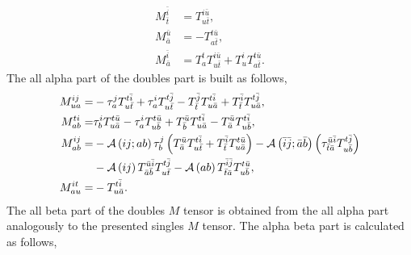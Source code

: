 \documentclass[a4paper,12pt,oneside]{book}
\newcommand{\asop}[1]{{\cal A}\left(#1\right)}
\newcommand{\ASop}[2]{{\cal A}\left(#1;#2\right)}
\newcommand{\spa}[1]{{#1}}
\newcommand{\spb}[1]{\bar{#1}}
\begin{document}
\begin{align}
M^{\spb{i}}_{\spb{t}} &= T^{\spa{i}\spb{u}}_{\spa{u}\spb{t}}, \\
M^{\spb{u}}_{\spb{a}} &= - T^{\spa{t}\spb{u}}_{\spa{a}\spb{t}}, \\
M^{\spb{i}}_{\bar{a}} &= T^{\spa{t}}_{\spa{a}} T^{\spa{i}\spb{u}}_{u\spb{t}} + T^{\spa{i}}_{\spa{u}} T^{\spa{t}\spb{u}}_{\spa{a}\spb{t}}.
\end{align}
The all alpha part of the doubles part is built as follows,
\begin{align}
M^{\spa{i}\spa{j}}_{\spa{u}\spa{a}} = &-\tau^{\spa{j}}_{\spa{a}} T^{\spa{t}\spb{i}}_{\spa{u}\spb{t}} 
                                       +\tau^{\spa{i}}_{\spa{a}} T^{\spa{t}\spb{j}}_{\spa{u}\spb{t}} 
                                       -T^{\spb{j}}_{\spb{t}} T^{\spa{t}\spb{i}}_{\spa{u}\spb{a}} 
                                       +T^{\spb{i}}_{\spb{t}} T^{\spa{t}\spb{j}}_{\spa{u}\spb{a}}, \\
M^{\spa{t}\spa{i}}_{\spa{a}\spa{b}} = &\tau^{\spa{i}}_{\spa{b}} T^{\spa{t}\spb{u}}_{\spa{u}\spb{a}} 
                                      -\tau^{\spa{i}}_{\spa{a}} T^{\spa{t}\spb{u}}_{\spa{u}\spb{b}} 
                                      +T^{\spb{u}}_{\spb{b}} T^{\spa{t}\spb{i}}_{\spa{u}\spb{a}} 
                                      -T^{\spb{u}}_{\spb{a}} T^{\spa{t}\spb{i}}_{\spa{u}\spb{b}}, \\
M^{\spa{i}\spa{j}}_{\spa{a}\spa{b}} = &-\ASop{ij}{ab} \tau^{\spa{j}}_{\spa{b}} \left( T^{\spb{u}}_{\spb{a}} T^{\spa{t}\spb{i}}_{\spa{u}\spb{t}} 
                                       +T^{\spb{i}}_{\spb{t}} T^{\spa{t}\spb{u}}_{\spa{u}\spb{a}} \right)
                                       -\ASop{\spb{i}\spb{j}}{\spb{a}\spb{b}} \left( \tau^{\spb{u}\spb{i}}_{\spb{t}\spb{a}} T^{\spa{t}\spb{j}}_{\spa{u}\spb{b}} \right) \nonumber \\
                                      &-\asop{\spa{i}\spa{j}} T^{\spb{u}\spb{i}}_{\spb{a}\spb{b}} T^{\spa{t}\spb{j}}_{\spa{u}\spb{t}} 
                                       -\asop{ab} T^{\spb{i}\spb{j}}_{\spb{t}\spb{a}} T^{\spa{t}\spb{u}}_{\spa{u}\spb{b}}, \\
M^{\spa{i}\spa{t}}_{\spa{a}\spa{u}} = &-T^{\spa{t}\spb{i}}_{\spa{u}\spb{a}}. 
\end{align}
The all beta part of the doubles $M$ tensor is obtained from the all alpha part analogously to the presented singles $M$ tensor. \newline
The alpha beta part is calculated as follows,
\end{document}
